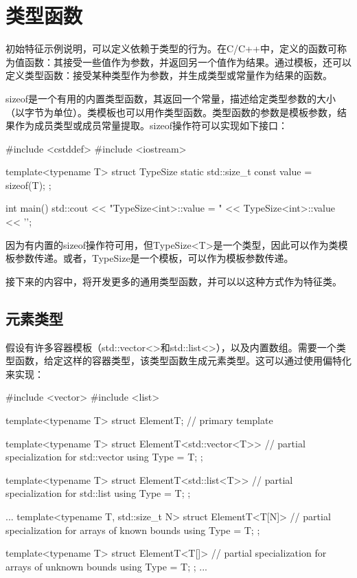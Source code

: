 \section{类型函数}

初始特征示例说明，可以定义依赖于类型的行为。在C/C++中，定义的函数可称为值函数：其接受一些值作为参数，并返回另一个值作为结果。通过模板，还可以定义类型函数：接受某种类型作为参数，并生成类型或常量作为结果的函数。

sizeof是一个有用的内置类型函数，其返回一个常量，描述给定类型参数的大小（以字节为单位）。类模板也可以用作类型函数。类型函数的参数是模板参数，结果作为成员类型或成员常量提取。sizeof操作符可以实现如下接口：

\begin{cpp}
#include <cstddef>
#include <iostream>

template<typename T>
struct TypeSize {
	static std::size_t const value = sizeof(T);
};

int main() {
	std::cout << "TypeSize<int>::value = "
	<< TypeSize<int>::value << '\n';
}
\end{cpp}

因为有内置的sizeof操作符可用，但TypeSize<T>是一个类型，因此可以作为类模板参数传递。或者，TypeSize是一个模板，可以作为模板参数传递。

接下来的内容中，将开发更多的通用类型函数，并可以以这种方式作为特征类。

\subsection{元素类型}

假设有许多容器模板（std::vector<>和std::list<>），以及内置数组。需要一个类型函数，给定这样的容器类型，该类型函数生成元素类型。这可以通过使用偏特化来实现：

\begin{cpp}
#include <vector>
#include <list>

template<typename T>
struct ElementT; // primary template

template<typename T>
struct ElementT<std::vector<T>> { // partial specialization for std::vector
	using Type = T;
};

template<typename T>
struct ElementT<std::list<T>> { // partial specialization for std::list
	using Type = T;
};

...
template<typename T, std::size_t N>
struct ElementT<T[N]> { // partial specialization for arrays of known bounds
	using Type = T;
};

template<typename T>
struct ElementT<T[]> { // partial specialization for arrays of unknown bounds
	using Type = T;
};
...
\end{cpp}

